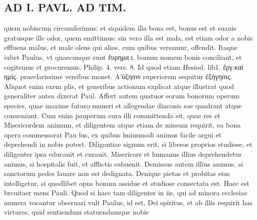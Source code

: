 \documentclass{article}
\begin{document}
\begin{pages}
\section*{AD I. PAVL. AD TIM. }
\marginpar{[ p.278 ]}\pstart quem nobiscum circumferimus: et siquidem illa bona est, bonus est et suauis gratusque ille odor, quem emittimus: sin vero illa est mala, est etiam odor a nobis effluens malus, et male olens qui alios, cum quibus versamur, offendit. Itaque iubet Paulus, vt quaecunque sunt ἕυρημα.ι. bonum nomem bonis conciliant, et cogitemus et procuremus. Philip. 4. vers. 8. Id quod etiam Hesiod. lib1. ἔργ.καί ημίς. praeclarissime versibus monet. Α’ύξησιν superiorem sequitur ἐξήγησις. Aliquot enim exem plis, et generibus actionum explicat atque illustrat quod generaliter antea dixerat Paul. Affert autem quatuor eorum bonorum operum species, quae maxime futuro muneri et allegendae diaconis sae quadrant atque conueniunt. Cum enim pauperum cura illi committenda sit, quae res et Misericordem animum, et diligentem atque etiam de missum requirit, ea bona opera commemorat Pau lus, ex quibus huiusmodi animus facile argui et deprehendi in nobis potest. Diligentiae signum erit, si liberos proprios studiose, et diligenter ipsa educauit et curauit.  Misericors et humanns illius deprehendetur animus, si hospitalis fuit, et afflictis subuenit. Demissus autem illius animus, si sanctorum pedes lauare non est dedignata. Denique pietas et probitas eius intelligetur, si quodlibet opus bonum assidue et studiose consectata est. Haec est breuitaer mens Pauli. Quod si haec tam diligenter in iis, qui ad minora ecclesiae munera vocantur obseruari vult Paulus, id est, Dei spiritus, et ab illis requirit has virtures, quid sentiendum statuendumque nobie  \pend

\end{pages}
\end{document}
